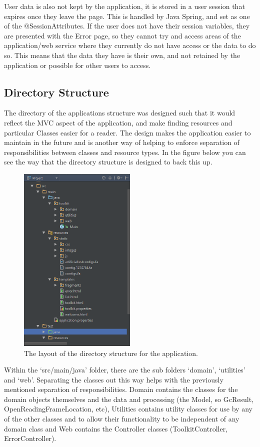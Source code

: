 User data is also not kept by the application, it is stored in a user session that expires once they leave the page. This is handled by Java Spring, and set as one of the @SessionAttributes. If the user does not have their session variables, they are presented with the Error page, so they cannot try and access areas of the application/web service where they currently do not have access or the data to do so. This means that the data they have is their own, and not retained by the application or possible for other users to access.

\subsection{Directory Structure}
The directory of the applications structure was designed such that it would reflect the MVC aspect of the application, and make finding resources and particular Classes easier for a reader. The design makes the application easier to maintain in the future and is another way of helping to enforce separation of responsibilities between classes and resource types. In the figure below you can see the way that the directory structure is designed to back this up.

\begin{figure}[H]
\centering
\includegraphics[width=0.5\textwidth]{images/directorystructure}
\caption{The layout of the directory structure for the application.}
\end{figure}

Within the `src/main/java' folder, there are the sub folders `domain', `utilities' and `web'. Separating the classes out this way helps with the previously mentioned separation of responsibilities. Domain contains the classes for the domain objects themselves and the data and processing (the Model, so GcResult, OpenReadingFrameLocation, etc), Utilities contains utility classes for use by any of the other classes and to allow their functionality to be independent of any domain class and Web contains the Controller classes (ToolkitController, ErrorController).

